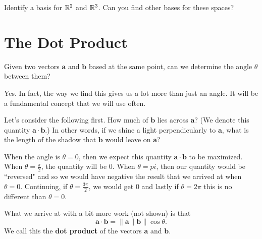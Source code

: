         \begin{exercise}
        Identify a basis for $\mathbb{R}^2$ and $\mathbb{R}^3$.  Can you find other bases for these spaces?
        \end{exercise}
        
        \section{The Dot Product}
        \begin{question}
        Given two vectors $\mathbf{a}$ and $\mathbf{b}$ based at the same point, can we determine the angle $\theta$ between them? 
        \end{question}
        
        \begin{center}
        \end{center}
        
        \begin{answer}
        Yes.  In fact, the way we find this gives us a lot more than just an angle.  It will be a fundamental concept that we will use often.
        \end{answer}
        
        Let's consider the following first.  How much of $\mathbf{b}$ lies across $\mathbf{a}$? (We denote this quantity $\mathbf{a}\cdot \mathbf{b}$.) In other words, if we shine a light perpendicularly to $\mathbf{a}$, what is the length of the shadow that $\mathbf{b}$ would leave on $\mathbf{a}$?
        
        When the angle is $\theta=0$, then we expect this quantity $\mathbf{a}\cdot \mathbf{b}$ to be maximized. When $\theta=\frac{\pi}{2}$, the quantity will be 0. When $\theta=pi$, then our quantity would be ``reversed" and so we would have negative the result that we arrived at when $\theta=0$.  Continuing, if $\theta=\frac{3\pi}{2}$, we would get 0 and lastly if $\theta=2\pi$ this is no different than $\theta=0$.  
        
        What we arrive at with a bit more work (not shown) is that
        \[
        \mathbf{a}\cdot \mathbf{b}=\|\mathbf{a}\|\mathbf{b}\| \cos \theta.
        \]
        We call this the \textbf{dot product} of the vectors $\mathbf{a}$ and $\mathbf{b}$.
        
